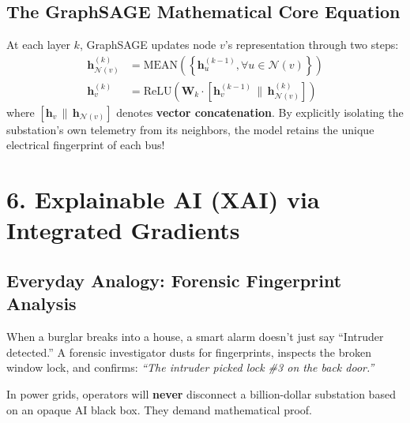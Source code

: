 \documentclass[10pt,a4paper]{article}
\begin{document}
\subsection{The GraphSAGE Mathematical Core Equation}
At each layer $k$, GraphSAGE updates node $v$'s representation through two steps:
\begin{equation*}
\begin{split}
\mathbf{h}_{\mathcal{N}(v)}^{(k)} &= \text{MEAN}\left(\left\{\mathbf{h}_u^{(k-1)}, \forall u \in \mathcal{N}(v)\right\}\right) \\
\mathbf{h}_v^{(k)} &= \text{ReLU}\left(\mathbf{W}_k \cdot \left[\mathbf{h}_v^{(k-1)} \,\|\, \mathbf{h}_{\mathcal{N}(v)}^{(k)}\right]\right)
\end{split}
\end{equation*}
where $[\mathbf{h}_v \,\|\, \mathbf{h}_{\mathcal{N}(v)}]$ denotes \textbf{vector concatenation}. By explicitly isolating the substation's own telemetry from its neighbors, the model retains the unique electrical fingerprint of each bus!

\section{6. Explainable AI (XAI) via Integrated Gradients}

\subsection{Everyday Analogy: Forensic Fingerprint Analysis}
When a burglar breaks into a house, a smart alarm doesn't just say ``Intruder detected.'' A forensic investigator dusts for fingerprints, inspects the broken window lock, and confirms: \textit{``The intruder picked lock \#3 on the back door.''} 

In power grids, operators will \textbf{never} disconnect a billion-dollar substation based on an opaque AI black box. They demand mathematical proof.
\end{document}
